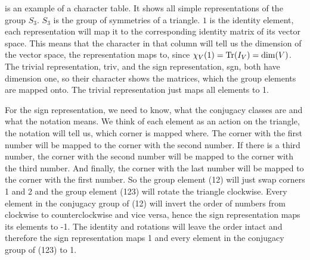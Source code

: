  is an example of a character table.
It shows all simple representations of the group $S_3$.
$S_3$ is the group of symmetries of a triangle.
$1$ is the identity element, each representation will map it to the corresponding identity matrix of its vector space.
This means that the character in that column will tell us the dimension of the vector space, the representation maps to, since $\chi_V(1) = \operatorname{Tr}(I_V) = \dim(V)$.
The trivial representation, triv, and the sign representation, sgn, both have dimension one, so their character shows the matrices, which the group elements are mapped onto.
The trivial representation just maps all elements to 1.

For the sign representation, we need to know, what the conjugacy classes are and what the notation means.
We think of each element as an action on the triangle, the notation will tell us, which corner is mapped where.
The corner with the first number will be mapped to the corner with the second number.
If there is a third number, the corner with the second number will be mapped to the corner with the third number.
And finally, the corner with the last number will be mapped to the corner with the first number.
So the group element (12) will just swap corners 1 and 2 and the group element (123) will rotate the triangle clockwise.
Every element in the conjugacy group of (12) will invert the order of numbers from clockwise to counterclockwise and vice versa, hence the sign representation maps its elements to -1.
The identity and rotations will leave the order intact and therefore the sign representation maps 1 and every element in the conjugacy group of (123) to 1.
